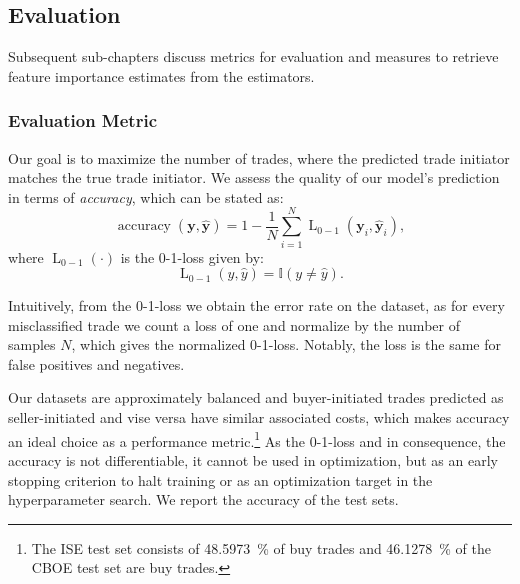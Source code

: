 \subsection{Evaluation}\label{sec:evaluation}

Subsequent sub-chapters discuss metrics for evaluation and measures to retrieve feature importance estimates from the estimators.

\subsubsection{Evaluation Metric}\label{sec:evaluation-metric}

Our goal is to maximize the number of trades, where the predicted trade initiator matches the true trade initiator. We assess the quality of our model’s prediction in terms of \emph{accuracy}, which can be stated as:
\begin{equation}
    \operatorname{accuracy}(\mathbf{y}, \widehat{\mathbf{y}}) = 1 - \frac{1}{N}\sum_{i=1}^{N} \operatorname{L}_{\mathrm{0-1}}(\mathbf{y}_i, \widehat{\mathbf{y}}_i),
\end{equation}
where $\operatorname{L}_{\mathrm{0-1}}(\cdot)$ is the 0-1-loss given by:
\begin{equation}
    \operatorname{L}_{\mathrm{0-1}}(y, \hat{y}) = \mathbb{I}\left(y\neq \hat{y}\right).
    \label{eq:0-1-loss}
\end{equation}

Intuitively, from the 0-1-loss we obtain the error rate on the dataset, as for every misclassified trade we count a loss of one and normalize by the number of samples $N$, which gives the normalized 0-1-loss. Notably, the loss is the same for false positives and negatives.

Our datasets are approximately balanced and buyer-initiated trades predicted as seller-initiated and vise versa have similar associated costs, which makes accuracy an ideal choice as a performance metric.\footnote{The \gls{ISE} test set consists of \SI{48.5973}{\percent} of buy trades and \SI{46.1278}{\percent} of the \gls{CBOE} test set are buy trades.} As the 0-1-loss and in consequence, the accuracy is not differentiable, it cannot be used in optimization, but as an early stopping criterion to halt training or as an optimization target in the hyperparameter search. We report the accuracy of the test sets.

